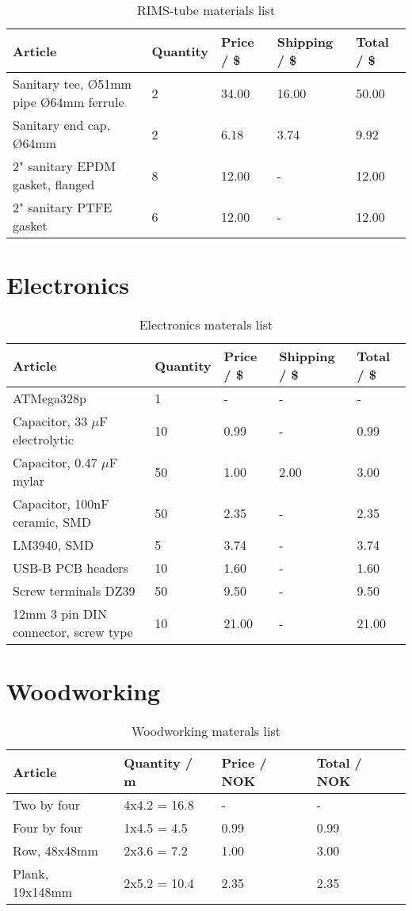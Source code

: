 \documentclass[11pt,fleqn]{book} %
\begin{document}
\begin{table}[h]
\centering
\begin{tabular}{l l l l l}
\toprule
Article & Quantity & Price / \$ & Shipping / \$ & Total / \$\\
\midrule
Sanitary tee, Ø51mm pipe Ø64mm ferrule & 2 & 34.00 & 16.00 & 50.00 \\
Sanitary end cap, Ø64mm & 2 & 6.18 & 3.74 & 9.92 \\
2" sanitary EPDM gasket, flanged & 8 & 12.00 & - & 12.00 \\
2" sanitary PTFE gasket & 6 & 12.00 & - & 12.00 \\
\bottomrule
\end{tabular}
\caption{RIMS-tube materials list}
\end{table}

\section{Electronics}

\begin{table}[h]
\centering
\begin{tabular}{l l l l l}
\toprule
Article & Quantity & Price / \$ & Shipping / \$ & Total / \$\\
\midrule
ATMega328p & 1 & - & - & - \\
Capacitor, 33 $\mu$F electrolytic & 10 & 0.99 & - & 0.99 \\
Capacitor, 0.47 $\mu$F mylar & 50 & 1.00 & 2.00 & 3.00 \\
Capacitor, 100nF ceramic, SMD & 50 & 2.35 & - & 2.35 \\
LM3940, SMD & 5 & 3.74 & - & 3.74 \\
USB-B PCB headers & 10 & 1.60 & - & 1.60 \\
Screw terminals DZ39 & 50 & 9.50 & - & 9.50 \\
12mm 3 pin DIN connector, screw type & 10 & 21.00 & - & 21.00 \\
\bottomrule
\end{tabular}
\caption{Electronics materals list}
\end{table}

\section{Woodworking}

\begin{table}[h]
\centering
\begin{tabular}{l l l l}
\toprule
Article & Quantity / m & Price / NOK & Total / NOK\\
\midrule
Two by four & 4x4.2 = 16.8 & - & - \\
Four by four & 1x4.5 = 4.5 & 0.99 & 0.99 \\
Row, 48x48mm & 2x3.6 = 7.2 & 1.00 & 3.00 \\
Plank, 19x148mm & 2x5.2 = 10.4 & 2.35 & 2.35 \\
\bottomrule
\end{tabular}
\caption{Woodworking materals list}
\end{table}
\end{document}

